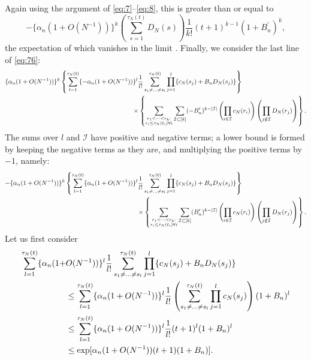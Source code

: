 \documentclass{article}
\newcommand{\1}[1]{\mathbbm{1}_{#1}}
\begin{document}
Again using the argument of \eqref{eq:7}--\eqref{eq:8}, this is greater than or equal to
\begin{equation}
- \{ \alpha_n (1 + O(N^{-1}) ) \}^k \left( \sum_{s=1}^{\tau_N(t)} D_N(s) \right) \frac{1}{k!} (t+1)^{k-1} (1 + B_n^\prime)^k , \label{eq:80a}
\end{equation}
the expectation of which vanishes in the limit \citep[Equation (5)]{brown2020}.
Finally, we consider the last line of \eqref{eq:76}:
\begin{align}
\{ \alpha_n (1 + O(N^{-1}) ) \}^k
&\left\{ \sum_{l=1}^{\tau_N(t)} \{ - \alpha_n (1 + O(N^{-1}) ) \}^l \frac{1}{l!}
\sum_{s_1 \neq \dots \neq s_l}^{\tau_N(t)} \prod_{j=1}^l
\{ c_N(s_j) + B_n D_N(s_j) \} \right\} \notag\\
&\hspace{4cm}\times
\left\{ \sum_{\substack{r_1 <\dots< r_k :\\ r_i \leq \tau_N(t_i) \forall i}}
\sum_{\mathcal{I} \subset [k]} (-B_n^\prime)^{k-|\mathcal{I}|}
\left( \prod_{i\in\mathcal{I}} c_N(r_i) \right)
\left( \prod_{j\notin\mathcal{I}} D_N(r_j) \right)
\right\} .
\end{align}
The sums over $l$ and $\mathcal{I}$ have positive and negative terms; a lower bound is formed by keeping the negative terms as they are, and multiplying the positive terms by $-1$, namely:
\begin{align}
- \{ \alpha_n (1 + O(N^{-1}) ) \}^k
&\left\{ \sum_{l=1}^{\tau_N(t)} \{ \alpha_n (1 + O(N^{-1}) ) \}^l \frac{1}{l!}
\sum_{s_1 \neq \dots \neq s_l}^{\tau_N(t)} \prod_{j=1}^l
\{ c_N(s_j) + B_n D_N(s_j) \} \right\} \notag\\
&\hspace{4cm}\times
\left\{ \sum_{\substack{r_1 <\dots< r_k :\\ r_i \leq \tau_N(t_i) \forall i}}
\sum_{\mathcal{I} \subset [k]} (B_n^\prime)^{k-|\mathcal{I}|}
\left( \prod_{i\in\mathcal{I}} c_N(r_i) \right)
\left( \prod_{j\notin\mathcal{I}} D_N(r_j) \right)
\right\} . \label{eq:82}
\end{align}
Let us first consider
\begin{align}
\sum_{l=1}^{\tau_N(t)} \{ \alpha_n (1 + &O(N^{-1}) ) \}^l \frac{1}{l!}
\sum_{s_1 \neq \dots \neq s_l}^{\tau_N(t)} \prod_{j=1}^l
\{ c_N(s_j) + B_n D_N(s_j) \} \notag\\
&\leq \sum_{l=1}^{\tau_N(t)} \{ \alpha_n (1 + O(N^{-1}) ) \}^l \frac{1}{l!}
\left( \sum_{s_1 \neq \dots \neq s_l}^{\tau_N(t)} \prod_{j=1}^l c_N(s_j) \right) (1+B_n)^l \notag\\
&\leq \sum_{l=1}^{\tau_N(t)} \{ \alpha_n (1 + O(N^{-1}) ) \}^l \frac{1}{l!}
(t+1)^l (1+B_n)^l \notag\\
&\leq \exp[ \alpha_n (1 + O(N^{-1}) ) (t+1) (1+B_n) ].
\end{align}
\end{document}
